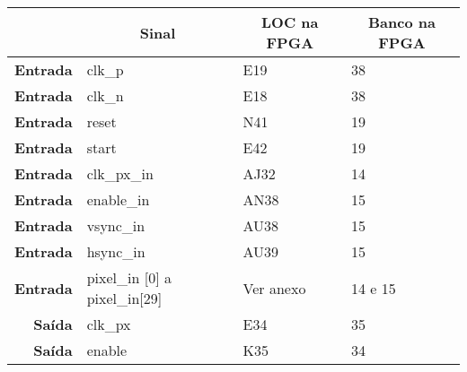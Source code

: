 \begin{table}[h!]
	\centering
		\begin{tabular}{rlll}
			\hline
			\multicolumn{1}{c}{\textbf{}}         & \multicolumn{1}{c}{\textbf{Sinal}}    & \multicolumn{1}{c}{\textbf{LOC na FPGA}} & \multicolumn{1}{c}{\textbf{Banco na FPGA}} \\ \hline
			\multicolumn{1}{r|}{\textbf{Entrada}} & clk\_p                                & E19                                      & 38                                         \\
			\multicolumn{1}{r|}{\textbf{Entrada}} & clk\_n                                & E18                                      & 38                                         \\
			\multicolumn{1}{r|}{\textbf{Entrada}} & reset                                 & N41                                      & 19                                         \\
			\multicolumn{1}{r|}{\textbf{Entrada}} & start                                 & E42                                      & 19                                         \\
			\multicolumn{1}{r|}{\textbf{Entrada}} & clk\_px\_in                           & AJ32                                     & 14                                         \\
			\multicolumn{1}{r|}{\textbf{Entrada}} & enable\_in                            & AN38                                     & 15                                         \\
			\multicolumn{1}{r|}{\textbf{Entrada}} & vsync\_in                             & AU38                                     & 15                                         \\
			\multicolumn{1}{r|}{\textbf{Entrada}} & hsync\_in                             & AU39                                     & 15                                         \\
			\multicolumn{1}{r|}{\textbf{Entrada}} & pixel\_in {[}0{]} a pixel\_in{[}29{]} & Ver anexo                                & 14 e 15                                    \\
			\multicolumn{1}{r|}{\textbf{Saída}}   & clk\_px                               & E34                                      & 35                                         \\
			\multicolumn{1}{r|}{\textbf{Saída}}   & enable                                & K35                                      & 34                                         \\

\end{tabular}
\end{table}
